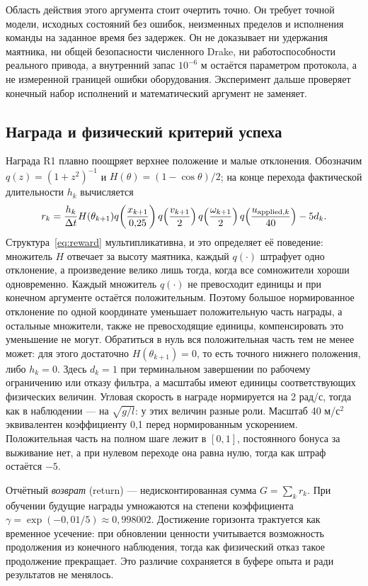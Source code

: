 Область действия этого аргумента стоит очертить точно. Он требует точной модели, исходных состояний без ошибок, неизменных пределов и исполнения команды на заданное время без задержек. Он не доказывает ни удержания маятника, ни общей безопасности численного Drake, ни работоспособности реального привода, а внутренний запас $10^{-6}$ м остаётся параметром протокола, а не измеренной границей ошибки оборудования. Эксперимент дальше проверяет конечный набор исполнений и математический аргумент не заменяет.

\subsection{Награда и физический критерий успеха}
Награда R1 плавно поощряет верхнее положение и малые отклонения. Обозначим $q(z)=(1+z^2)^{-1}$ и $H(\theta)=(1-\cos\theta)/2$; на конце перехода фактической длительности $h_k$ вычисляется
\begin{equation}
r_k=\frac{h_k}{\Delta t}H(\theta_{k+1})
q\!\left(\frac{x_{k+1}}{0{,}25}\right)
q\!\left(\frac{v_{k+1}}{2}\right)
q\!\left(\frac{\omega_{k+1}}{2}\right)
q\!\left(\frac{u_{{\rm applied},k}}{40}\right)-5d_k.
\label{eq:reward}
\end{equation}
Структура~\eqref{eq:reward} мультипликативна, и это определяет её поведение: множитель $H$ отвечает за высоту маятника, каждый $q(\cdot)$ штрафует одно отклонение, а произведение велико лишь тогда, когда все сомножители хороши одновременно. Каждый множитель $q(\cdot)$ не превосходит единицы и при конечном аргументе остаётся положительным. Поэтому большое нормированное отклонение по одной координате уменьшает положительную часть награды, а остальные множители, также не превосходящие единицы, компенсировать это уменьшение не могут. Обратиться в нуль вся положительная часть тем не менее может: для этого достаточно $H(\theta_{k+1})=0$, то есть точного нижнего положения, либо $h_k=0$. Здесь $d_k=1$ при терминальном завершении по рабочему ограничению или отказу фильтра, а масштабы имеют единицы соответствующих физических величин. Угловая скорость в награде нормируется на 2 рад/с, тогда как в наблюдении — на $\sqrt{g/l}$: у этих величин разные роли. Масштаб 40 м/с$^2$ эквивалентен коэффициенту 0,1 перед нормированным ускорением. Положительная часть на полном шаге лежит в $[0,1]$, постоянного бонуса за выживание нет, а при нулевом переходе она равна нулю, тогда как штраф остаётся $-5$.

Отчётный \emph{возврат} (return) — недисконтированная сумма $G=\sum_k r_k$. При обучении будущие награды умножаются на степени коэффициента $\gamma=\exp(-0{,}01/5)\approx0{,}998002$. Достижение горизонта трактуется как временное усечение: при обновлении ценности учитывается возможность продолжения из конечного наблюдения, тогда как физический отказ такое продолжение прекращает. Это различие сохраняется в буфере опыта и ради результатов не менялось.

